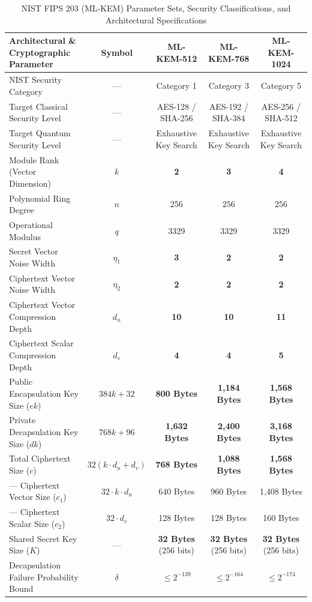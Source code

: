 \begin{table}[t]
\caption{NIST FIPS 203 (\mbox{ML-KEM}) Parameter Sets, Security Classifications, and Architectural Specifications}
\label{tab:fips203_parameters}
\centering
\footnotesize
\begin{tabular}{@{}l c c c c@{}}
\toprule
\textbf{Architectural \& Cryptographic Parameter} & \textbf{Symbol} & \textbf{ML-KEM-512} & \textbf{ML-KEM-768} & \textbf{ML-KEM-1024} \\
\midrule
NIST Security Category & --- & Category 1 & Category 3 & Category 5 \\
Target Classical Security Level & --- & AES-128 / SHA-256 & AES-192 / SHA-384 & AES-256 / SHA-512 \\
Target Quantum Security Level & --- & Exhaustive Key Search & Exhaustive Key Search & Exhaustive Key Search \\
Module Rank (Vector Dimension) & $k$ & \textbf{2} & \textbf{3} & \textbf{4} \\
Polynomial Ring Degree & $n$ & 256 & 256 & 256 \\
Operational Modulus & $q$ & 3329 & 3329 & 3329 \\
Secret Vector Noise Width & $\eta_1$ & \textbf{3} & \textbf{2} & \textbf{2} \\
Ciphertext Vector Noise Width & $\eta_2$ & \textbf{2} & \textbf{2} & \textbf{2} \\
Ciphertext Vector Compression Depth & $d_u$ & \textbf{10} & \textbf{10} & \textbf{11} \\
Ciphertext Scalar Compression Depth & $d_v$ & \textbf{4} & \textbf{4} & \textbf{5} \\
Public Encapsulation Key Size ($ek$) & $384k + 32$ & \textbf{800 Bytes} & \textbf{1,184 Bytes} & \textbf{1,568 Bytes} \\
Private Decapsulation Key Size ($dk$) & $768k + 96$ & \textbf{1,632 Bytes} & \textbf{2,400 Bytes} & \textbf{3,168 Bytes} \\
Total Ciphertext Size ($c$) & $32(k \cdot d_u + d_v)$ & \textbf{768 Bytes} & \textbf{1,088 Bytes} & \textbf{1,568 Bytes} \\
\quad --- Ciphertext Vector Size ($c_1$) & $32 \cdot k \cdot d_u$ & 640 Bytes & 960 Bytes & 1,408 Bytes \\
\quad --- Ciphertext Scalar Size ($c_2$) & $32 \cdot d_v$ & 128 Bytes & 128 Bytes & 160 Bytes \\
Shared Secret Key Size ($K$) & --- & \textbf{32 Bytes} (256 bits) & \textbf{32 Bytes} (256 bits) & \textbf{32 Bytes} (256 bits) \\
Decapsulation Failure Probability Bound & $\delta$ & $\le 2^{-139}$ & $\le 2^{-164}$ & $\le 2^{-174}$ \\
\bottomrule
\end{tabular}
\end{table}

